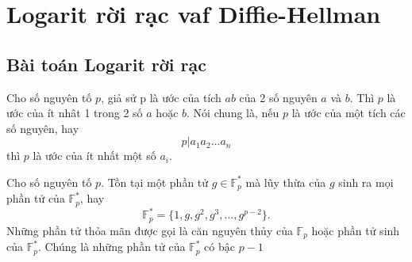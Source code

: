 \section{Logarit rời rạc vaf Diffie-Hellman}
\subsection{Bài toán Logarit rời rạc}

\begin{proposition}
	\label{propos:pr1}
	Cho số nguyên tố $p$, giả sử p là ước của tích $ab$ của 2 số nguyên $a$ và $b$. Thì $p$ là ước của ít nhât 1 trong 2 số $a$ hoặc $b$.
	Nói chung là, nếu $p$ là ước của một tích các số nguyên, hay
	$$ p | a_1a_2\ldots a_n$$
	thì $p$ là ước của ít nhất một số $a_i$.
\end{proposition}

\begin{theorem}
	\label{th:primitiveroot}
	Cho số nguyên tố $p$. Tồn tại một phần tử $g \in \mathbb{F}^*_p$ mà lũy thừa của $g$ sinh ra mọi phần tử của $\mathbb{F}^*_p$, hay
	$$ \mathbb{F}^*_p = \{ 1, g, g^2, g^3, \ldots, g^{p-2} \}.$$
	Những phần tử thỏa mãn được gọi là căn nguyên thủy của $\mathbb{F}_p$ hoặc phần tử sinh của $\mathbb{F}_p^*$. Chúng là những phần tử của  $\mathbb{F}_p^*$ có bậc $p-1$
\end{theorem}

